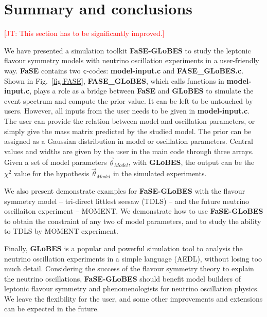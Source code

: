 \documentclass[aps,prd,nofootinbib,preprint]{revtex4}
\begin{document}
\section{Summary and conclusions}
\textcolor{red}{[JT: This section has to be significantly improved.]}

We have presented a simulation toolkit \textbf{FaSE-GLoBES} to study the leptonic flavour symmetry models with neutrino oscillation experiments in a user-friendly way. \textbf{FaSE} contains two \texttt{c}-codes: \textbf{model-input.c} and \textbf{FASE\_GLoBES.c}. Shown in Fig.~\ref{fig:FASE}, \textbf{FASE\_GLoBES}, which calls functions in \textbf{model-input.c}, plays a role as a bridge between \textbf{FaSE} and \textbf{GLoBES} to simulate the event spectrum and compute the prior value. It can be left to be untouched by users. However, all inputs from the user needs to be given in \textbf{model-input.c}. The user can provide the relation between model and oscillation parameters, or simply give the mass matrix predicted by the studied model. The prior can be assigned as a Gaussian distribution in model or oscillation parameters. Central values and widths are given by the user in the main code through three arrays. Given a set of model parameters $\vec{\theta}_{Model}$, with \textbf{GLoBES}, the output can be the $\chi^2$ value for the hypothesis $\vec{\theta}_{Model}$ in the simulated experiments.

We also present demonstrate examples for \textbf{FaSE-GLoBES} with the flavour symmetry model -- tri-direct littlest seesaw (TDLS) -- and the future neutrino oscillaiton experiment -- MOMENT. We demonstrate how to use \textbf{FaSE-GLoBES} to obtain the constraint of any two of model parameters, and to study the ability to TDLS by MOMENT experiment.

Finally, \textbf{GLoBES} is a popular and powerful simulation tool to analysis the neutrino oscillation experiments in a simple language (AEDL), without losing too much detail. Considering the success of the flavour symmetry theory to explain the neutrino oscillations, \textbf{FaSE-GLoBES} should benefit model builders of leptonic flavour symmetry and phenomenologists for neutrino oscillation physics. We leave the flexibility for the user, and some other improvements and extensions can be expected in the future.



%

\end{document}
